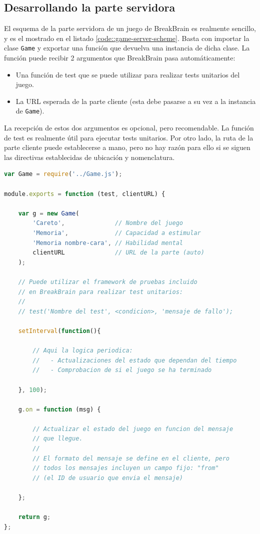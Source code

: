 \subsection{Desarrollando la parte servidora}

El esquema de la parte servidora de un juego de BreakBrain es realmente sencillo, y es el mostrado en el listado \ref{code::game-server-scheme}. Basta con importar la clase {\tt Game} y exportar una función que devuelva una instancia de dicha clase. La función puede recibir 2 argumentos que BreakBrain pasa automáticamente:

\begin{itemize}
\item Una función de test que se puede utilizar para realizar tests unitarios del juego.
\item La URL esperada de la parte cliente (esta debe pasarse a su vez a la instancia de {\tt Game}).
\end{itemize}

La recepción de estos dos argumentos es opcional, pero recomendable. La función de test es realmente útil para ejecutar tests unitarios. Por otro lado, la ruta de la parte cliente puede establecerse a mano, pero no hay razón para ello si se siguen las directivas establecidas de ubicación y nomenclatura.

\newpage
\begin{lstlisting}[frame=single, language=JavaScript, caption={Esquema de la parte servidora de un juego para BreakBrain}, label=code::game-server-scheme]
var Game = require('../Game.js');

module.exports = function (test, clientURL) {

    var g = new Game(
        'Careto',              // Nombre del juego
        'Memoria',             // Capacidad a estimular
        'Memoria nombre-cara', // Habilidad mental
        clientURL              // URL de la parte (auto)
    );

    // Puede utilizar el framework de pruebas incluido
    // en BreakBrain para realizar test unitarios:
    // 
    // test('Nombre del test', <condicion>, 'mensaje de fallo');

    setInterval(function(){

        // Aqui la logica periodica:
        //   - Actualizaciones del estado que dependan del tiempo
        //   - Comprobacion de si el juego se ha terminado

    }, 100);

    g.on = function (msg) {

        // Actualizar el estado del juego en funcion del mensaje
        // que llegue.
        //
        // El formato del mensaje se define en el cliente, pero
        // todos los mensajes incluyen un campo fijo: "from"
        // (el ID de usuario que envia el mensaje)

    };

    return g;
};
\end{lstlisting}

